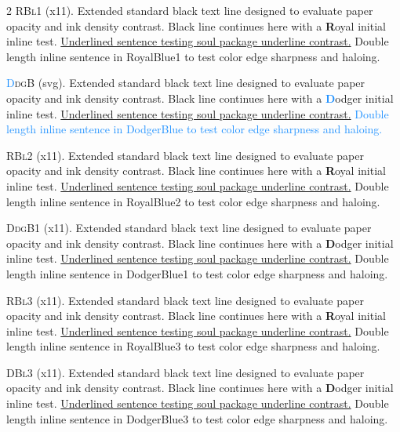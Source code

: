 \begin{multicols}{2}
\lettrine[lines=2]{\textcolor{RoyalBlue1}{R}}{Bl1} (x11). Extended standard black text line designed to evaluate paper opacity and ink density contrast. Black line continues here with a \textbf{\textcolor{RoyalBlue1}{R}}oyal initial inline test. \ul{Underlined sentence testing soul package underline contrast.} \textcolor{RoyalBlue1}{Double length inline sentence in RoyalBlue1 to test color edge sharpness and haloing.}


\lettrine[lines=2]{\textcolor{DodgerBlue}{D}}{dgB} (svg). Extended standard black text line designed to evaluate paper opacity and ink density contrast. Black line continues here with a \textbf{\textcolor{DodgerBlue}{D}}odger initial inline test. \ul{Underlined sentence testing soul package underline contrast.} \textcolor{DodgerBlue}{Double length inline sentence in DodgerBlue to test color edge sharpness and haloing.}


\lettrine[lines=2]{\textcolor{RoyalBlue2}{R}}{Bl2} (x11). Extended standard black text line designed to evaluate paper opacity and ink density contrast. Black line continues here with a \textbf{\textcolor{RoyalBlue2}{R}}oyal initial inline test. \ul{Underlined sentence testing soul package underline contrast.} \textcolor{RoyalBlue2}{Double length inline sentence in RoyalBlue2 to test color edge sharpness and haloing.}


\lettrine[lines=2]{\textcolor{DodgerBlue1}{D}}{dgB1} (x11). Extended standard black text line designed to evaluate paper opacity and ink density contrast. Black line continues here with a \textbf{\textcolor{DodgerBlue1}{D}}odger initial inline test. \ul{Underlined sentence testing soul package underline contrast.} \textcolor{DodgerBlue1}{Double length inline sentence in DodgerBlue1 to test color edge sharpness and haloing.}


\lettrine[lines=2]{\textcolor{RoyalBlue3}{R}}{Bl3} (x11). Extended standard black text line designed to evaluate paper opacity and ink density contrast. Black line continues here with a \textbf{\textcolor{RoyalBlue3}{R}}oyal initial inline test. \ul{Underlined sentence testing soul package underline contrast.} \textcolor{RoyalBlue3}{Double length inline sentence in RoyalBlue3 to test color edge sharpness and haloing.}


\lettrine[lines=2]{\textcolor{DodgerBlue3}{D}}{Bl3} (x11). Extended standard black text line designed to evaluate paper opacity and ink density contrast. Black line continues here with a \textbf{\textcolor{DodgerBlue3}{D}}odger initial inline test. \ul{Underlined sentence testing soul package underline contrast.} \textcolor{DodgerBlue3}{Double length inline sentence in DodgerBlue3 to test color edge sharpness and haloing.}



\end{multicols}
